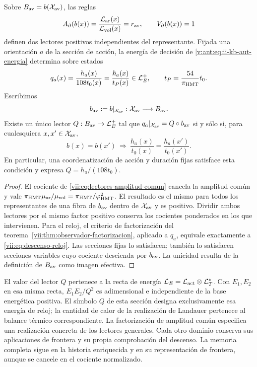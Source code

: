 \begin{proposition}
\label{vii:prop:lectores-frontera-explicitos}
Sobre \(B_{\rm av}=b(\mathcal X_{\rm av})\), las reglas
\begin{equation}
 A_\partial(b(x))
 =\frac{\mathcal L_{\rm ar}(x)}{\mathcal L_{\rm vol}(x)}
 =r_{\rm av},\qquad V_\partial(b(x))=1
 \label{vii:eq:lectores-normalizados}
\end{equation}
definen dos lectores positivos independientes del representante.
Fijada una orientación \(a\) de la sección de acción, la energía de
decisión de \eqref{v:ant:eq:ii-kb-aut-energia} determina sobre estados
\begin{equation}
 q_a(x)=\frac{h_a(x)}{108t_0(x)}
       =\frac{\hbar_a(x)}{t_P(x)}\in\mathcal L_E^+,
 \qquad t_P=\frac{54}{\pi_{\rm HMT}}t_0.
 \label{vii:eq:lector-q-accion}
\end{equation}
Escribimos
\[
 b_{\rm av}:=b|_{\mathcal X_{\rm av}}:
 \mathcal X_{\rm av}\longrightarrow B_{\rm av}.
\]
Existe un único lector \(Q:B_{\rm av}\to\mathcal L_E^+\) tal que
\(q_a|_{\mathcal X_{\rm av}}=Q\circ b_{\rm av}\)
si y sólo si, para cualesquiera \(x,x'\in\mathcal X_{\rm av}\),
\begin{equation}
 b(x)=b(x')\ \Longrightarrow\
 \frac{h_a(x)}{t_0(x)}=\frac{h_a(x')}{t_0(x')}.
 \label{vii:eq:descenso-reloj}
\end{equation}
En particular, una coordenatización de acción y duración fijas satisface esta
condición y expresa \(Q=h_a/(108t_0)\).
\end{proposition}
\begin{proof}
El cociente de \eqref{vii:eq:lectores-amplitud-comun} cancela la
amplitud común y vale
\(\pi_{\rm HMT}\mu_{\rm ar}/\mu_{\rm vol}
=\pi_{\rm HMT}/\varphi_{\rm HMT}^2\).
El resultado es el mismo para todos los representantes de una fibra
de \(b_{\rm av}\) dentro de \(\mathcal X_{\rm av}\) y es positivo.
Dividir ambos lectores por el mismo factor positivo
conserva los cocientes ponderados en los que intervienen.
Para el reloj, el criterio de factorización del
teorema~\ref{vii:thm:observador-factorizacion}, aplicado a \(q_a\),
equivale exactamente a \eqref{vii:eq:descenso-reloj}. Las secciones
fijas lo satisfacen; también lo satisfacen secciones variables cuyo
cociente descienda por \(b_{\rm av}\). La unicidad resulta de la definición
de \(B_{\rm av}\) como imagen efectiva.
\end{proof}

El valor del lector \(Q\) pertenece a la recta de energía
\(\mathcal L_E=\mathcal L_{\rm act}\otimes\mathcal L_T^*\).
Con \(E_1,E_2\) en esa misma recta,
\(E_1E_2/Q^2\) es adimensional e independiente de la base energética
positiva. El símbolo \(Q\) de esta sección designa exclusivamente
esa energía de reloj; la cantidad de calor de la realización de
Landauer pertenece al balance térmico correspondiente.
La factorización de amplitud común especifica una realización
concreta de los lectores generales. Cada otro dominio conserva sus
aplicaciones de frontera y su propia comprobación del descenso.
La memoria completa sigue en la historia enriquecida y en su
representación de frontera, aunque se cancele en el cociente normalizado.


